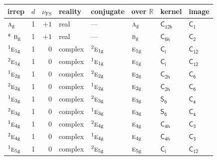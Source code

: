 \documentclass[10pt,a4paper]{article}
\numberwithin{equation}{section}
\newcommand{\grp}[1]{\mathsf{#1}}
\newcommand{\irr}[1]{\text{\normalfont\scshape #1}}
\newcommand{\conjpair}[1]{{}^{#1}}
\newcommand{\ptag}[1]{\mathrm{#1}}
\newcommand{\fsind}{\nu_{\mathrm{FS}}}
\begin{document}
{\small\renewcommand{\arraystretch}{1.25}\setlength{\tabcolsep}{4pt}\begin{longtable}{@{}lrrlllll@{}}\toprule
irrep & $d$ & $\fsind$ & reality & conjugate & over $\mathbb{R}$ & kernel & image\\\midrule\endhead
\bottomrule\endfoot\endlastfoot
$\irr{a}_{\ptag{g}}$ & 1 & $+1$ & real & --- & $\irr{a}_{\ptag{g}}$ & \href{C12h.pdf}{$\grp{C_{12h}}$} & \href{C1.pdf}{$\grp{C_{1}}$}\\*
$\irr{b}_{\ptag{g}}$ & 1 & $+1$ & real & --- & $\irr{b}_{\ptag{g}}$ & \href{C6h.pdf}{$\grp{C_{6h}}$} & \href{C2.pdf}{$\grp{C_{2}}$}\\
$\conjpair{1}\irr{e}_{1\ptag{g}}$ & 1 & $0$ & complex & $\conjpair{2}\irr{e}_{1\ptag{g}}$ & $\irr{e}_{1\ptag{g}}$ & \href{S2.pdf}{$\grp{C_{i}}$} & \href{C12.pdf}{$\grp{C_{12}}$}\\
$\conjpair{2}\irr{e}_{1\ptag{g}}$ & 1 & $0$ & complex & $\conjpair{1}\irr{e}_{1\ptag{g}}$ & $\irr{e}_{1\ptag{g}}$ & \href{S2.pdf}{$\grp{C_{i}}$} & \href{C12.pdf}{$\grp{C_{12}}$}\\
$\conjpair{1}\irr{e}_{2\ptag{g}}$ & 1 & $0$ & complex & $\conjpair{2}\irr{e}_{2\ptag{g}}$ & $\irr{e}_{2\ptag{g}}$ & \href{C2h.pdf}{$\grp{C_{2h}}$} & \href{C6.pdf}{$\grp{C_{6}}$}\\
$\conjpair{2}\irr{e}_{2\ptag{g}}$ & 1 & $0$ & complex & $\conjpair{1}\irr{e}_{2\ptag{g}}$ & $\irr{e}_{2\ptag{g}}$ & \href{C2h.pdf}{$\grp{C_{2h}}$} & \href{C6.pdf}{$\grp{C_{6}}$}\\
$\conjpair{1}\irr{e}_{3\ptag{g}}$ & 1 & $0$ & complex & $\conjpair{2}\irr{e}_{3\ptag{g}}$ & $\irr{e}_{3\ptag{g}}$ & \href{S6.pdf}{$\grp{S_{6}}$} & \href{C4.pdf}{$\grp{C_{4}}$}\\
$\conjpair{2}\irr{e}_{3\ptag{g}}$ & 1 & $0$ & complex & $\conjpair{1}\irr{e}_{3\ptag{g}}$ & $\irr{e}_{3\ptag{g}}$ & \href{S6.pdf}{$\grp{S_{6}}$} & \href{C4.pdf}{$\grp{C_{4}}$}\\
$\conjpair{1}\irr{e}_{4\ptag{g}}$ & 1 & $0$ & complex & $\conjpair{2}\irr{e}_{4\ptag{g}}$ & $\irr{e}_{4\ptag{g}}$ & \href{C4h.pdf}{$\grp{C_{4h}}$} & \href{C3.pdf}{$\grp{C_{3}}$}\\
$\conjpair{2}\irr{e}_{4\ptag{g}}$ & 1 & $0$ & complex & $\conjpair{1}\irr{e}_{4\ptag{g}}$ & $\irr{e}_{4\ptag{g}}$ & \href{C4h.pdf}{$\grp{C_{4h}}$} & \href{C3.pdf}{$\grp{C_{3}}$}\\
$\conjpair{1}\irr{e}_{5\ptag{g}}$ & 1 & $0$ & complex & $\conjpair{2}\irr{e}_{5\ptag{g}}$ & $\irr{e}_{5\ptag{g}}$ & \href{S2.pdf}{$\grp{C_{i}}$} & \href{C12.pdf}{$\grp{C_{12}}$}\\

\end{longtable}}
\end{document}
